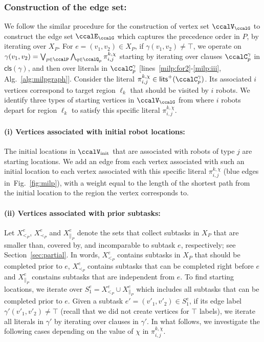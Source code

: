 \documentclass[Afour,sageh,times]{sagej}
\newcommand{\clause}[1]{\mathsf{cls}(#1)}
\renewcommand{\ap}[3]{\mathcal{\pi}_{{#1},{#2}}^{#3}}
\begin{document}
\subsubsection{Construction of  the edge set:}\label{sec:edge_set} We follow the similar procedure for the construction of vertex set $\ccalV_\ccalG$ to construct the edge set $\ccalE_\ccalG$ which captures the precedence order in ${P}$, by iterating over $X_P$. For $e = (v_1, v_2) \in X_{P}$, if $\gamma(v_1, v_2) \not=\top$, we operate on $\gamma(v_1, v_2) =  \bigvee_{p\in \ccalP} \bigwedge_{q \in \ccalQ_{p}} \ap{i}{j}{k,\chi}$ starting by iterating over clauses $\ccalC_p^{\gamma}$ in $\clause{\gamma}$, and then over literals in $\ccalC_p^\gamma$ [lines~\ref{milp:for2}-\ref{milp:iii}, Alg.~\ref{alg:milpgraph}]. Consider the literal $\ap{i}{j}{k,\chi} \in \mathsf{lits}^+(\ccalC_p^{\gamma})$. Its associated $i$ vertices correspond to target region $\ell_k$ that should be visited by $i$ robots. We identify three types of starting vertices in $\ccalV_\ccalG$ from where $i$ robots depart for region $\ell_k$ to satisfy this specific literal $\ap{i}{j}{k,\chi}$.

\paragraph{(i) Vertices associated with initial robot locations:}\label{sec:a} The initial locations in $\ccalV_{\text{init}}$ that are associated with  robots of type $j$ are starting locations. We add an edge from each vertex associated with such an initial location to each vertex associated with this specific literal $\ap{i}{j}{k,\chi}$ (blue edges in~Fig.~\ref{fig:milp}), with a weight equal to the length of the shortest path from the initial location to the region the vertex corresponds to.

\paragraph{(ii) Vertices associated with prior subtasks:}\label{sec:b} Let $X^e_{<_{P}}$, $X^e_{\prec_{P}}$ and $X^e_{\|_{P}}$ denote the sets that collect subtasks in $X_{P}$ that are  smaller than, covered by, and incomparable to subtask $e$, respectively; see Section~\ref{sec:partial}. In words, $X^e_{<_{P}}$ contains subtasks in $X_P$ that should be completed prior to $e$, $X^e_{\prec_{P}}$ contains subtasks that can be completed right before $e$ and $X^e_{\|_{P}}$ constains subtasks that are independent from $e$. To find starting locations, we iterate over $S_1^e = X^e_{<_{P}} \cup X^e_{\|_{P}}$ which includes all subtasks that can be completed prior to $e$.
Given a subtask $e' = (v'_1, v'_2) \in S_1^e$, if its edge label $\gamma'(v'_1, v'_2) \not=\top$ (recall that we did not create vertices for $\top$ labels), we iterate all literals in $\gamma'$ by iterating over clauses in $\gamma'$. In what follows, we investigate the following cases depending on the value of $\chi$ in $\ap{i}{j}{k,\chi}$.
\end{document}
